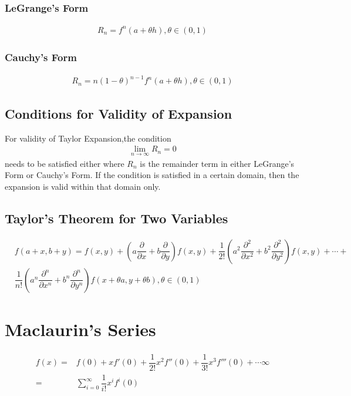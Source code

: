 \documentclass[../main.tex]{subfile}
\begin{document}
        \subsubsection{LeGrange's Form}
            \begin{align}
            R_n=f^n (a+\theta h), \theta \in (0,1)
            \end{align}
        \subsubsection{Cauchy's Form}
            \begin{align}
            R_n=n(1-\theta)^{n-1}f^n(a+\theta h), \theta \in (0,1)
            \end{align}

    \subsection{Conditions for Validity of Expansion}
    For validity of Taylor Expansion,the condition
        \begin{align}
        \lim_{n\to\infty} R_n=0
        \end{align}
    needs to be satisfied either where $R_n$ is the remainder term in either LeGrange's Form or Cauchy's Form. If the condition is satisfied in a certain domain, then the expansion is valid within that domain only.

    \subsection{Taylor's Theorem for Two Variables}
    \begin{align}
        & f(a + x,b + y) = f(x,y) + \left( a \dfrac{\partial}{\partial x} + b \dfrac{\partial}{\partial y} \right) f (x,y) + \dfrac{1}{2!} \left( a^2 \dfrac{\partial^2}{\partial x^2}+b^2\dfrac{\partial^2}{\partial y^2} \right) f(x,y) + \cdots + \nonumber \\
        & \dfrac{1}{n!} \left( a^n \dfrac{\partial^n}{\partial x^n} + b^n \dfrac{\partial^n}{\partial y^n} \right) f(x + \theta a, y + \theta b), \theta \in (0,1) 
    \end{align}

    \section{Maclaurin's Series}
    \begin{align}
        f(x) = & f(0) + xf'(0) + \dfrac{1}{2!} x^2 f''(0) + \dfrac{1}{3!} x^3 f'''(0) + \cdots\infty\\
             = & \sum_{i=0}^\infty \dfrac{1}{i!} x^i f^i(0)
    \end{align}
    
\end{document}

